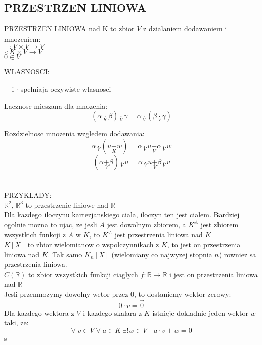 \documentclass{article}
\newcommand{\R}{\mathbb{R}}
\begin{document}
\subsection*{PRZESTRZEN LINIOWA}
  \begin{center}
    \color{def}PRZESTRZEN LINIOWA nad K \color{txt}to zbior $V$ z dzialaniem dodawaniem i mnozeniem:\smallskip\\
    $+:V\times V\to V$\smallskip\\
    $\cdot:K\times V\to V$\smallskip\\
    $0\in V$
  \end{center}
  \color{def}WLASNOSCI:\color{txt}\smallskip\par
    + i $\cdot$ spelniaja oczywiste wlasnosci\smallskip\par
    Lacznosc mieszana dla mnozenia:
    $$(\alpha \underset{K}{\cdot}\beta)\underset{V}{\cdot}\gamma = \alpha\underset{V}{\cdot}(\beta\underset{V}{\cdot}\gamma)$$\par
    Rozdzielnosc mnozenia wzgledem dodawania:
    $$\alpha\underset{V}{\cdot}(u\underset{K}{+}w) = \alpha\underset{V}{\cdot}u\underset{V}{+}\alpha\underset{V}{\cdot}w$$
    $$(\alpha\underset{V}{+}\beta)\underset{V}{\cdot}u = \alpha\underset{V}{\cdot}u\underset{V}{+}\beta\underset{V}{\cdot}v$$ \\ \\
  \color{emp}PRZYKLADY:\color{txt}\smallskip\\
    $\R^2$, $\R^3$ to przestrzenie liniowe nad $\R$\medskip\\
    Dla kazdego iloczynu kartezjanskiego ciala, iloczyn ten jest cialem. Bardziej ogolnie mozna to ujac, ze jesli $A$ jest dowolnym zbiorem, a $K^A$ jest zbiorem wszystkich funkcji z $A$ w $K$, to $K^A$ jest przestrzenia liniowa nad $K$\medskip\\
    $K[X]$ to zbior wielomianow o wspolczynnikach z $K$, to jest on przestrzenia liniowa nad $K$. Tak samo $K_n[X]$ (wielomiany co najwyzej stopnia $n$) rowniez sa przestrzenia liniowa.\medskip\\
    $C(\R)$ to zbior wszystkich funkcji ciaglych $f:\R\to\R$ i jest on przestrzenia liniowa nad $\R$\bigskip\\
  Jesli przemnozymy dowolny wetor przez 0, to dostaniemy \color{acc}wektor zerowy\color{txt}:
  $$0\cdot v=\overset{\to}{0}$$
  Dla kazdego wektora z $V$ i kazdego skalara z $K$ istnieje dokladnie jeden wektor $w$ taki, ze:
  $$\forall\;v\in V\;\forall\;a\in K\;\exists!w\in V\quad a\cdot v+w=0$$s
\end{document}
